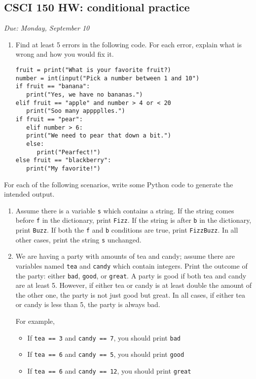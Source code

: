 \documentclass[]{article}
\date{}
\providecommand{\tightlist}{%
  \setlength{\itemsep}{0pt}\setlength{\parskip}{0pt}}
\begin{document}
\subsection{CSCI 150 HW: conditional
practice}\label{csci-150-hw-conditional-practice}

\emph{Due: Monday, September 10}

\begin{enumerate}
\def\labelenumi{\arabic{enumi}.}
\item
  Find at least 5 errors in the following code. For each error, explain
  what is wrong and how you would fix it.

\begin{verbatim}
fruit = print("What is your favorite fruit?)
number = int(input("Pick a number between 1 and 10")
if fruit == "banana":
   print("Yes, we have no bananas.")
elif fruit == "apple" and number > 4 or < 20
   print("Soo many apppplles.")
if fruit == "pear":
   elif number > 6:
   print("We need to pear that down a bit.")
   else:
      print("Pearfect!")
else fruit == "blackberry":
   print("My favorite!")
\end{verbatim}
\end{enumerate}

For each of the following scenarios, write some Python code to generate
the intended output.

\begin{enumerate}
\def\labelenumi{\arabic{enumi}.}
\setcounter{enumi}{1}
\item
  Assume there is a variable \texttt{s} which contains a string. If the
  string comes before \texttt{f} in the dictionary, print \texttt{Fizz}.
  If the string is after \texttt{b} in the dictionary, print
  \texttt{Buzz}. If both the \texttt{f} and \texttt{b} conditions are
  true, print \texttt{FizzBuzz}. In all other cases, print the string
  \texttt{s} unchanged.
\item
  We are having a party with amounts of tea and candy; assume there are
  variables named \texttt{tea} and \texttt{candy} which contain
  integers. Print the outcome of the party: either \texttt{bad},
  \texttt{good}, or \texttt{great}. A party is good if both tea and
  candy are at least 5. However, if either tea or candy is at least
  double the amount of the other one, the party is not just good but
  great. In all cases, if either tea or candy is less than 5, the party
  is always bad.

  For example,

  \begin{itemize}
  \tightlist
  \item
    If \texttt{tea\ ==\ 3} and \texttt{candy\ ==\ 7}, you should print
    \texttt{bad}
  \item
    If \texttt{tea\ ==\ 6} and \texttt{candy\ ==\ 5}, you should print
    \texttt{good}
  \item
    If \texttt{tea\ ==\ 6} and \texttt{candy\ ==\ 12}, you should print
    \texttt{great}
  \end{itemize}
\end{enumerate}
\end{document}
